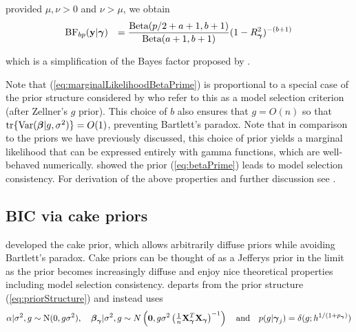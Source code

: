 \noindent provided $\mu,\nu>0$ and $\nu>\mu$, we obtain
\begin{equation}\label{eq:marginalLikelihoodBetaPrime}
	\begin{array}{rl}
		\displaystyle \mbox{BF}_{bp}({\bf y}|{\boldsymbol \gamma}) 
		& \displaystyle 
		=   
		\frac{\mbox{Beta}(p/2 + a + 1,b + 1)}{\mbox{Beta}(a+1,b+1)} (1-R_{\boldsymbol \gamma}^2)^{-(b + 1)}
	\end{array}
\end{equation}

\noindent which is a simplification of the Bayes factor proposed by
\cite{Maruyama2011}.


Note that (\ref{eq:marginalLikelihoodBetaPrime}) is proportional
to a special case of the prior structure considered by \cite{Maruyama2011}
who refer to this as a model selection criterion (after Zellner's $g$ prior). This choice of $b$ also ensures that $g = O(n)$ so that $\mbox{tr}\{\mbox{Var}({\boldsymbol \beta} | g, \sigma^2)\} = O(1)$, preventing Bartlett's paradox. 
Note that in comparison to the priors we have previously discussed, this choice of prior yields a marginal
likelihood that can be expressed entirely with gamma functions, which are well-behaved numerically.
\cite{Maruyama2011} showed the prior (\ref{eq:betaPrime}) leads to model
selection consistency.
For derivation of the above properties and further discussion see \cite{Maruyama2011}.




\subsection{BIC via cake priors}  

\noindent
\cite{OrmerodEtal2017} developed the cake prior, which allows arbitrarily diffuse priors while avoiding
Bartlett's paradox.
Cake priors
can be thought of as a Jefferys prior in the limit
as the prior becomes increasingly diffuse
and enjoy nice theoretical properties including model
selection consistency. \cite{OrmerodEtal2017} 
departs from the prior structure (\ref{eq:priorStructure}) and instead uses
\begin{equation}\label{eq:proirs2}
	\displaystyle \alpha|\sigma^2,g \sim \text{N}(0,g\sigma^2), \quad 
	\displaystyle {\boldsymbol\beta}_{\boldsymbol \gamma}|\sigma^2,g \sim N\left( {\bf 0},g\sigma^2\left( \tfrac{1}{n}{\bf X}_{\boldsymbol \gamma}^T{\bf X}_{\boldsymbol \gamma}\right)^{-1}\right)
	\quad \mbox{and} \quad
	p(g|{\boldsymbol \gamma}_j) = \delta(g; h^{1/(1 + p_{\boldsymbol \gamma})})
\end{equation}

